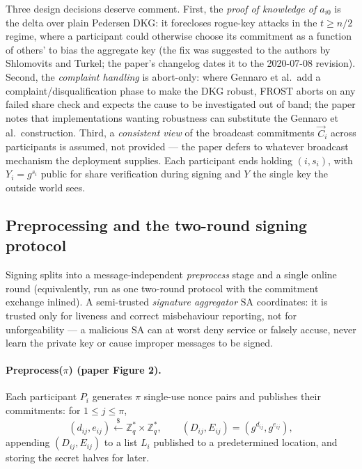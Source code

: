 \documentclass[11pt,a4paper]{article}
\theoremstyle{definition}
\newcommand{\Z}{\mathbb{Z}}
\begin{document}
Three design decisions deserve comment. First, the \emph{proof of
knowledge of $a_{i0}$} is the delta over plain Pedersen DKG: it forecloses
rogue-key attacks in the $t \ge n/2$ regime, where a participant could
otherwise choose its commitment as a function of others' to bias the
aggregate key (the fix was suggested to the authors by Shlomovits and
Turkel; the paper's changelog dates it to the 2020-07-08 revision).
Second, the \emph{complaint handling} is abort-only: where Gennaro et
al.\ add a complaint/disqualification phase to make the DKG robust, FROST
aborts on any failed share check and expects the cause to be investigated
out of band; the paper notes that implementations wanting robustness can
substitute the Gennaro et al.\ construction. Third, a \emph{consistent
view} of the broadcast commitments $\vec{C}_i$ across participants is
assumed, not provided --- the paper defers to whatever broadcast mechanism
the deployment supplies. Each participant ends holding $(i, s_i)$, with
$Y_i = g^{s_i}$ public for share verification during signing and $Y$ the
single key the outside world sees.

\subsection{Preprocessing and the two-round signing protocol}
\label{sec:fr-sign}

Signing splits into a message-independent \emph{preprocess} stage and a
single online round (equivalently, run as one two-round protocol with the
commitment exchange inlined). A semi-trusted \emph{signature aggregator}
$\mathrm{SA}$ coordinates: it is trusted only for liveness and correct
misbehaviour reporting, not for unforgeability --- a malicious
$\mathrm{SA}$ can at worst deny service or falsely accuse, never learn the
private key or cause improper messages to be signed.

\paragraph{Preprocess($\pi$) (paper Figure 2).} Each participant $P_i$
generates $\pi$ single-use nonce pairs and publishes their commitments:
for $1 \le j \le \pi$,
\[
(d_{ij}, e_{ij}) \xleftarrow{\$} \Z_q^* \times \Z_q^*, \qquad
(D_{ij}, E_{ij}) = (g^{d_{ij}}, g^{e_{ij}}),
\]
appending $(D_{ij}, E_{ij})$ to a list $L_i$ published to a predetermined
location, and storing the secret halves for later.
\end{document}
